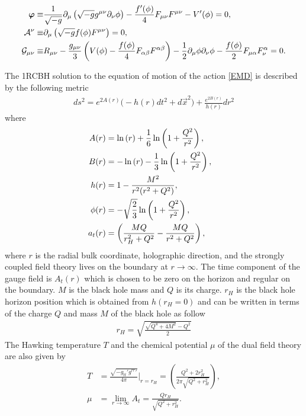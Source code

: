 \documentclass[preprintnumbers,aps,prd,longbibliography,nofootinbib,nobibnotes,amsmath,amssymb]{revtex4}
\begin{document}
\begin{align}\label{eq3}
 \boldsymbol{\varphi} \equiv &{1\over \sqrt{-g}} \partial_\mu\left(\sqrt{-g} g^{\mu \nu} \partial_\nu \phi\right) - {f'(\phi) \over 4} F_{\mu \nu}F^{\mu \nu} - V'(\phi)=0,\nonumber\\
 \mathcal{A}^\nu \equiv &\partial_\mu\left(\sqrt{-g} f(\phi) F^{\mu\nu}\right)=0,\nonumber\\
 \mathcal{G}_{\mu \nu} \equiv & R_{\mu \nu} - {g_{\mu \nu} \over 3} \left(V(\phi) - {f(\phi) \over 4} F_{\alpha \beta} F^{\alpha \beta}\right) - {1\over 2}\partial_\mu \phi \partial_\nu \phi - {f(\phi) \over 2} F_{\mu \alpha} F_\nu^\alpha=0.
 \end{align}


The 1RCBH solution  to the equation of motion of the action  \eqref{EMD}  is described by the following metric
\begin{align}\label{1RCBH}
ds^2=e^{2A(r)}\bigg(-h(r)dt^2+d\vec{x}^2\bigg)+\frac{e^{2B(r)}}{h(r)}dr^2
\end{align}
where
\begin{align}\label{coef}
A(r)&=\ln\left(r\right)+\frac{1}{6}\ln \left(1+\frac{Q^2}{r^2}\right),\cr 
B(r)&=-\ln\left(r\right)-\frac{1}{3}\ln \left(1+\frac{Q^2}{r^2}\right),\cr
h(r)&=1-\frac{M^2}{r^2(r^2+Q^2)}, \cr
\phi(r)&=-\sqrt{\frac{2}{3}} \ln\left(1+\frac{Q^2}{r^2}\right),\cr
a_t(r)&=\left(\frac{MQ}{r_{H}^2+ Q^2}-\frac{MQ}{r^2 +Q^2} \right),
\end{align}
where $r$ is the radial bulk coordinate, holographic direction, and the strongly coupled field theory lives on the boundary at $r \to \infty$. The time component of the gauge field is  $A_t(r)$  which is chosen to be zero on the horizon and regular on the boundary. $M$ is the black hole mass and $Q$ is its charge. $r_H$ is the black hole horizon position which is obtained from $h(r_{H}=0)$ and can be written in terms of the charge $Q$ and mass $M$ of the black hole as follow
\begin{align}
r_H=\sqrt{\frac{\sqrt{Q^4+4M^2}-Q^2}{2}}
\end{align}
The Hawking  temperature $T$ and the chemical potential  $\mu$ of the dual field theory are also given by
\begin{subequations}
\begin{align}
\label{temperature}T&=\frac{\sqrt{-g_{tt}' {g^{rr}}' }}{4\pi}\Bigg\vert_{r=r_{H}}=\left(\frac{Q^2+2r_{H}^{2}}{2\pi\sqrt{Q^2+r_H^2}}\right),\\
\label{ch}\mu &=\lim\limits_{r\rightarrow\infty}A_t=\frac{Qr_{H}}{\sqrt{Q^2+r_H^2}}.
\end{align}
\end{subequations}
\end{document}
